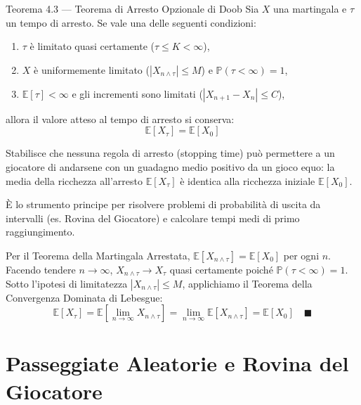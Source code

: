 \documentclass[11pt,a4paper]{report}
\newcommand{\PP}{\mathbb{P}}
\newcommand{\E}{\mathbb{E}}
\newcommand{\1}{\mathbf{1}}
\begin{document}
\newpage

\begin{teoremabox}{Teorema 4.3 --- Teorema di Arresto Opzionale di Doob}
Sia $X$ una martingala e $\tau$ un tempo di arresto. Se vale una delle seguenti condizioni:
\begin{enumerate}
    \item $\tau$ è limitato quasi certamente ($\tau \le K < \infty$),
    \item $X$ è uniformemente limitato ($|X_{n \wedge \tau}| \le M$) e $\PP(\tau < \infty) = 1$,
    \item $\E[\tau] < \infty$ e gli incrementi sono limitati ($|X_{n+1} - X_n| \le C$),
\end{enumerate}
allora il valore atteso al tempo di arresto si conserva:
\[ \E[X_\tau] = \E[X_0] \]
\end{teoremabox}

\begin{cosafa}
Stabilisce che nessuna regola di arresto (stopping time) può permettere a un giocatore di andarsene con un guadagno medio positivo da un gioco equo: la media della ricchezza all'arresto $\E[X_\tau]$ è identica alla ricchezza iniziale $\E[X_0]$.
\end{cosafa}

\begin{acosaserve}
È lo strumento principe per risolvere problemi di probabilità di uscita da intervalli (es. Rovina del Giocatore) e calcolare tempi medi di primo raggiungimento.
\end{acosaserve}

\begin{dimostrazione}
Per il Teorema della Martingala Arrestata, $\E[X_{n \wedge \tau}] = \E[X_0]$ per ogni $n$.  
Facendo tendere $n \to \infty$, $X_{n \wedge \tau} \to X_\tau$ quasi certamente poiché $\PP(\tau < \infty)=1$.  
Sotto l'ipotesi di limitatezza $|X_{n \wedge \tau}| \le M$, applichiamo il Teorema della Convergenza Dominata di Lebesgue:
\[ \E[X_\tau] = \E\left[\lim_{n \to \infty} X_{n \wedge \tau}\right] = \lim_{n \to \infty} \E[X_{n \wedge \tau}] = \E[X_0] \quad \blacksquare \]
\end{dimostrazione}

\newpage

\chapter{Passeggiate Aleatorie e Rovina del Giocatore}
\end{document}
